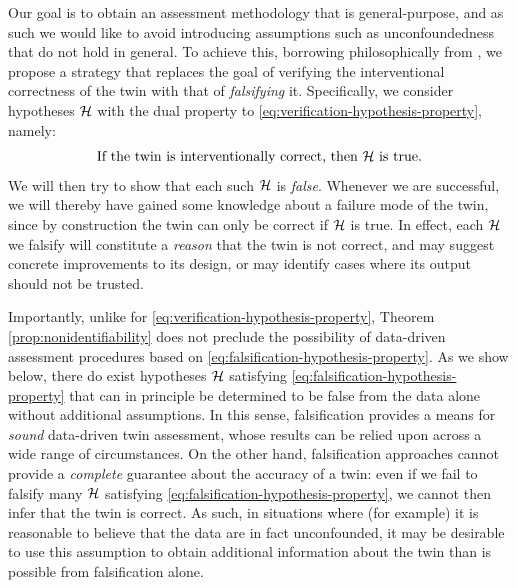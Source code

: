 Our goal is to obtain an assessment methodology that is general-purpose, and as such we would like to avoid introducing assumptions such as unconfoundedness that do not hold in general.
To achieve this, borrowing philosophically from \cite{popper2005logic}, we propose a strategy that replaces the goal of verifying the interventional correctness of the twin with that of \emph{falsifying} it.
Specifically, we consider hypotheses $\mathcal{H}$ with the dual property to \eqref{eq:verification-hypothesis-property}, namely:
\begin{equation} \label{eq:falsification-hypothesis-property}
    \text{If the twin is interventionally correct, then $\mathcal{H}$ is true.}
\end{equation}
We will then try to show that each such $\mathcal{H}$ is \emph{false}.
Whenever we are successful, we will thereby have gained some knowledge about a failure mode of the twin, since by construction the twin can only be correct if $\mathcal{H}$ is true.
In effect, each $\mathcal{H}$ we falsify will constitute a \emph{reason} that the twin is not correct, and may suggest concrete improvements to its design, or may identify cases where its output should not be trusted.

Importantly, unlike for \eqref{eq:verification-hypothesis-property}, Theorem \ref{prop:nonidentifiability} does not preclude the possibility of data-driven assessment procedures based on \eqref{eq:falsification-hypothesis-property}.
As we show below, there do exist hypotheses $\mathcal{H}$ satisfying \eqref{eq:falsification-hypothesis-property} that can in principle be determined to be false from the data alone without additional assumptions.
In this sense, falsification provides a means for \emph{sound} data-driven twin assessment, %
whose results can be relied upon across a wide range of circumstances.
On the other hand, falsification approaches cannot provide a \emph{complete} guarantee about the accuracy of a twin: even if we fail to falsify many $\mathcal{H}$ satisfying \eqref{eq:falsification-hypothesis-property}, we cannot then infer that the twin is correct.
As such, in situations where (for example) it is reasonable to believe that the data are in fact unconfounded, it may be desirable to use this assumption to obtain additional information about the twin than is possible from falsification alone.


